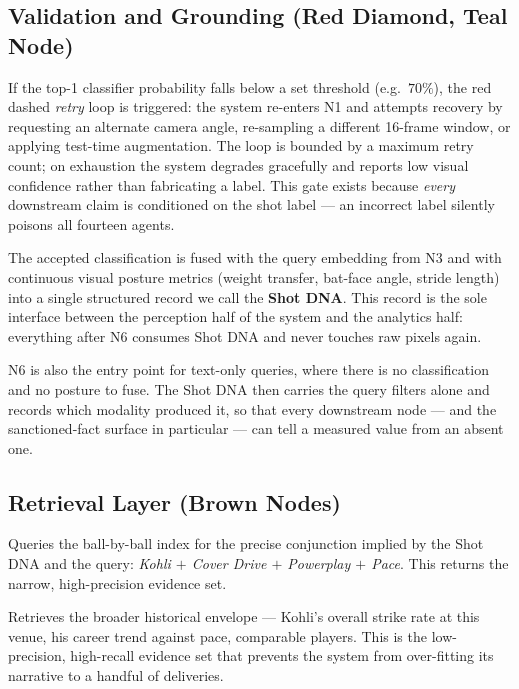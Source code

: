 \documentclass[11pt,a4paper]{article}
\begin{document}
\subsection{Validation and Grounding (Red Diamond, Teal Node)}

\begin{description}[leftmargin=0em,style=nextline]
\item[Confidence Check (Red Diamond).]
  If the top-1 classifier probability falls below a set threshold (e.g.\ $70\%$),
  the red dashed \emph{retry} loop is triggered: the system re-enters N1 and
  attempts recovery by requesting an alternate camera angle, re-sampling a
  different 16-frame window, or applying test-time augmentation. The loop is
  bounded by a maximum retry count; on exhaustion the system degrades gracefully
  and reports low visual confidence rather than fabricating a label. This gate
  exists because \emph{every} downstream claim is conditioned on the shot label
  --- an incorrect label silently poisons all fourteen agents.

\item[N6 --- Multimodal Shot DNA Generation.]
  The accepted classification is fused with the query embedding from N3 and with
  continuous visual posture metrics (weight transfer, bat-face angle, stride
  length) into a single structured record we call the \textbf{Shot DNA}. This
  record is the sole interface between the perception half of the system and the
  analytics half: everything after N6 consumes Shot DNA and never touches raw
  pixels again.

  N6 is also the entry point for text-only queries, where there is no
  classification and no posture to fuse. The Shot DNA then carries the query
  filters alone and records which modality produced it, so that every downstream
  node --- and the sanctioned-fact surface in particular --- can tell a measured
  value from an absent one.
\end{description}

\subsection{Retrieval Layer (Brown Nodes)}

\begin{description}[leftmargin=0em,style=nextline]
\item[N7a --- Stats Retrieval (FAISS, Cricsheet).]
  Queries the ball-by-ball index for the precise conjunction implied by the Shot
  DNA and the query: \emph{Kohli $+$ Cover Drive $+$ Powerplay $+$ Pace}. This
  returns the narrow, high-precision evidence set.

\item[N7b --- Context Retrieval (FAISS, Kaggle).]
  Retrieves the broader historical envelope --- Kohli's overall strike rate at
  this venue, his career trend against pace, comparable players. This is the
  low-precision, high-recall evidence set that prevents the system from
  over-fitting its narrative to a handful of deliveries.
\end{description}
\end{document}
